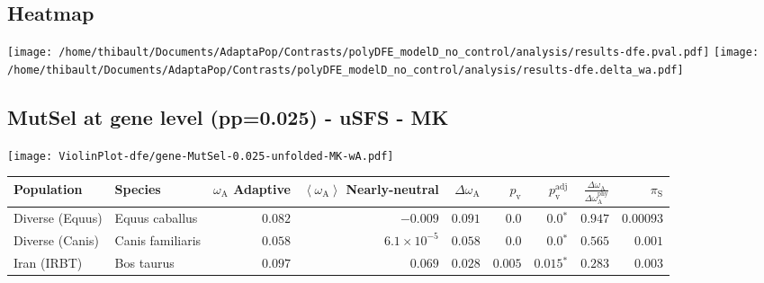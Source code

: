 \subsection{Heatmap} 
\begin{center}
\texttt{[image: /home/thibault/Documents/AdaptaPop/Contrasts/polyDFE\_modelD\_no\_control/analysis/results-dfe.pval.pdf]} 
\texttt{[image: /home/thibault/Documents/AdaptaPop/Contrasts/polyDFE\_modelD\_no\_control/analysis/results-dfe.delta\_wa.pdf]} 
\end{center}
\subsection{MutSel at gene level (pp=0.025) - uSFS - MK} 
\begin{center}
\texttt{[image: ViolinPlot-dfe/gene-MutSel-0.025-unfolded-MK-wA.pdf]} 
\begin{adjustbox}{width = 1\textwidth}
\begin{tabular}{|l|l|r|r|r|r|r|r|r|}
\toprule
                     Population &              Species & \specialcell{$\omega_{\mathrm{A}}$ \\ Adaptive} & \specialcell{$\left< \omega_{\mathrm{A}} \right>$ \\ Nearly-neutral} & $\Delta \omega_{\mathrm{A}} $ & $p_{\mathrm{v}}$ & $p_{\mathrm{v}}^{\mathrm{adj}}$ & $\frac{\Delta\omega_{\mathrm{A}}}{\Delta\omega_{\mathrm{A}}^{\mathrm{phy}}}$ & $\pi_{\textrm{S}}$ \\
\midrule
                Diverse (Equus) &       Equus caballus &                                        $ 0.082$ &                                           $-0.009$ &                      $ 0.091$ &            $0.0$ &                  $\bm{0.0{^*}}$ &                                           $ 0.947$ &          $0.00093$ \\
                Diverse (Canis) &     Canis familiaris &                                        $ 0.058$ &                                $6.1\times 10^{-5}$ &                      $ 0.058$ &            $0.0$ &                  $\bm{0.0{^*}}$ &                                           $ 0.565$ &           $ 0.001$ \\
                    Iran (IRBT) &           Bos taurus &                                        $ 0.097$ &                                           $ 0.069$ &                      $ 0.028$ &         $ 0.005$ &               $\bm{ 0.015{^*}}$ &                                           $ 0.283$ &           $ 0.003$ \\

\end{tabular}
\end{adjustbox}
\end{center}
